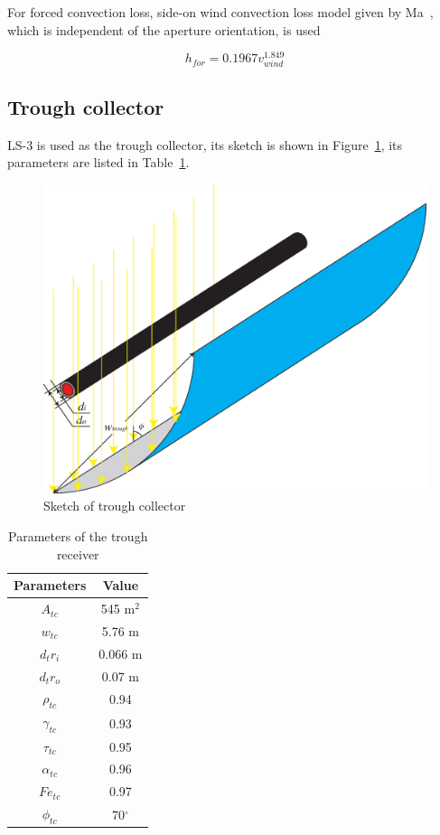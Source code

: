 \documentclass{article}
\begin{document}
For forced convection loss, side-on wind convection loss model given by Ma~\cite{Ma1993}, which is independent of the aperture orientation, is used

\begin{equation*}
	h_{for}=0.1967v_{wind}^{1.849}
\end{equation*}

\subsection{Trough collector}

LS-3 is used as the trough collector, its sketch is shown in Figure~\ref{fig:tC}, its parameters are listed in Table~\ref{tab:tc}.

\noindent \begin{figure}[htbp]
\begin{center}
	\includegraphics[width = 0.7\columnwidth]{./graphics/troughCollector}
	\caption{Sketch of trough collector}
	\label{fig:tC}
\end{center}
\end{figure}

\begin{table}[htbp]
	\caption{Parameters of the trough receiver}
	\begin{center}
	\begin{tabular}{cc}
		\toprule
		Parameters	&	Value\\
		\midrule
		$A_{tc}$	&	545 m$^2$\\
		$w_{tc}$&	5.76 m\\
		$d_tr_i$		&	0.066 m\\
		$d_tr_o$	&	0.07 m\\
		$\rho_{tc}$		&	0.94\\
		$\gamma_{tc}$	&	0.93\\
		$\tau_{tc}$		&	0.95\\
		$\alpha_{tc}$	&	0.96\\
		$Fe_{tc}$		&	0.97\\
		$\phi_{tc}$	&	70$^\circ$\\
		\bottomrule
	\end{tabular}
	\end{center}
	\label{tab:tc}
\end{table}
\end{document}

